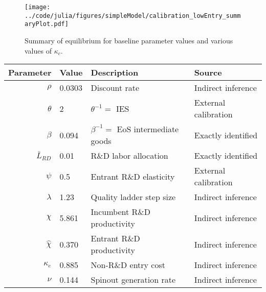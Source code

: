 \documentclass[11pt,english]{article}
\begin{document}
\begin{figure}[]
	\texttt{[image: ../code/julia/figures/simpleModel/calibration\_lowEntry\_summaryPlot.pdf]}
	\caption{Summary of equilibrium for baseline parameter values and various values of $\kappa_c$.}
	\label{calibration_lowEntry_summaryPlot}
\end{figure}

\begin{table}[]
	\centering
	\label{calibration_lowEntry_parameters}
	\begin{tabular}{rlll}
		\toprule \toprule
		Parameter & Value & Description & Source \tabularnewline
		\midrule
		$\rho$ & 0.0303 & Discount rate  & Indirect inference \tabularnewline
		$\theta$ & 2 & $\theta^{-1} = $ IES & External calibration 
		\tabularnewline
		$\beta$ & 0.094 & $\beta^{-1} = $ EoS intermediate goods & Exactly identified \tabularnewline 
		$\bar{L}_{RD}$ & 0.01 & R\&D labor allocation  & Exactly identified \tabularnewline
		$\psi$ & 0.5 & Entrant R\&D elasticity & External calibration \tabularnewline
		$\lambda$ & 1.23 & Quality ladder step size & Indirect inference 
		\tabularnewline
		$\chi$ & 5.861 & Incumbent R\&D productivity & Indirect inference 
		\tabularnewline
		$\hat{\chi}$ & 0.370 & Entrant R\&D productivity & Indirect inference \tabularnewline 
		$\kappa_e$ & 0.885 & Non-R\&D entry cost & Indirect inference \tabularnewline
		$\nu$ & 0.144 & Spinout generation rate  & Indirect inference\tabularnewline
		\bottomrule
	\end{tabular}
\end{table}
\end{document}

